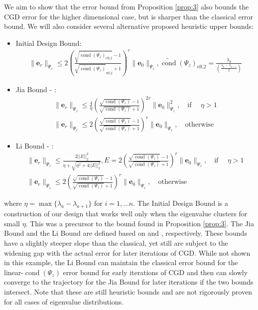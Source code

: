 \documentclass[11p]{elsarticle}
\numberwithin{equation}{section}
\newcommand{\vect}[1]{\ensuremath{\bm{#1}}}
\begin{document}
We aim to show that the error bound from Proposition \ref{prop:3} also bounds the CGD error for the higher dimensional case, but is sharper than the classical error bound.  We will also consider several alternative proposed heuristic upper bounds:
\begin{itemize}
    \item Initial Design Bound: \begin{align*}\| \vect{e}_r\|_{\Psi_{z}} \leq 2(\frac{\sqrt{\widetilde{\operatorname{cond}}(\Psi_{z})_{\text{eff,2}}} - 1}{\sqrt{\widetilde{\operatorname{cond}}(\Psi_{z})}_{\text{eff,2}} +1})^{r} \| \vect{e}_0\|_{\Psi_{z}}, \widetilde{\operatorname{cond}}(\Psi_{z})_{\text{eff,2}}=\frac{\lambda_b}{\left(\frac{\lambda_a - \lambda_{a+1}}{2}\right)} \end{align*}

    \item Jia Bound - \cite{Jia2001}: 
    \begin{align*}
    \| \vect{e}_r\|_{\Psi_{z}} \leq \frac{4}{\eta}(\frac{\sqrt{\operatorname{cond}(\Psi_{z})} - 1}{\sqrt{\operatorname{cond}(\Psi_{z})} +1})^{2r} \| \vect{e}_0\|_{\Psi_{z}}^2, \quad \text{if } \quad \eta > 1 \\
    \| \vect{e}_r\|_{\Psi_{z}} \leq 2(\frac{\sqrt{\operatorname{cond}(\Psi_{z})} - 1}{\sqrt{\operatorname{cond}(\Psi_{z})} +1})^{r} \| \vect{e}_0\|_{\Psi_{z}}, \quad \text{otherwise }\end{align*}

    \item Li Bound - \cite{Li2005}:
    \begin{align*}
    \| \vect{e}_r\|_{\Psi_{z}} \leq \frac{2 ||E||_2^2}{\eta+\sqrt{\eta^2+4||E||_2^2}}, 
    E = 2(\frac{\sqrt{\operatorname{cond}(\Psi_{z})} - 1}{\sqrt{\operatorname{cond}(\Psi_{z})} +1})^{r} \| \vect{e}_0\|_{\Psi_{z}}, \quad \text{if } \quad \eta > 1 \\
    \| \vect{e}_r\|_{\Psi_{z}} \leq 2(\frac{\sqrt{\operatorname{cond}(\Psi_{z})} - 1}{\sqrt{\operatorname{cond}(\Psi_{z})} +1})^{r} \| \vect{e}_0\|_{\Psi_{z}}, \quad \text{otherwise }
\end{align*}
\end{itemize}
where $\eta = \max{\{\lambda_{a}-\lambda_{a+1}\}}$ for $i=1,...n$.  The Initial Design Bound is a construction of our design that works well only when the eigenvalue clusters for small $\eta$.  This was a precursor to the bound found in Proposition \ref{prop:3}.  The Jia Bound and the Li Bound are defined based on \cite{Jia2001} and \cite{Li2005}, respectively.  These bounds have a slightly steeper slope than the classical, yet still are subject to the widening gap with the actual error for later iterations of CGD.  While not shown in this example, the Li Bound can maintain the classical error bound for the linear-$\operatorname{cond}(\Psi_{z})$ error bound for early iterations of CGD and then can slowly converge to the trajectory for the Jia Bound for later iterations if the two bounds intersect.  Note that these are still heuristic bounds and are not rigorously proven for all cases of eigenvalue distributions.
\end{document}
